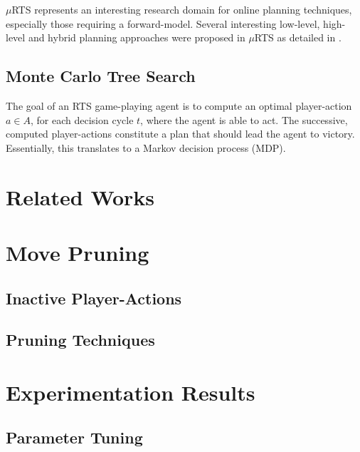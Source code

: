 \documentclass[conference]{IEEEtran}
\newcommand{\mRTS}{$\mu$RTS}
\begin{document}
\mRTS{} represents an interesting research domain for online planning techniques, especially those requiring a forward-model. Several interesting low-level, high-level and hybrid planning approaches were proposed in \mRTS{} as detailed in \cite{ouessai_online_2019}.

\subsection{Monte Carlo Tree Search}

The goal of an RTS game-playing agent is to compute an optimal player-action $a \in A$, for each decision cycle $t$, where the agent is able to act. The successive, computed player-actions constitute a plan that should lead the agent to victory. Essentially, this translates to a Markov decision process (MDP).


\section{Related Works}

\section{Move Pruning}

\subsection{Inactive Player-Actions}

\subsection{Pruning Techniques}

\section{Experimentation Results}

\subsection{Parameter Tuning}

\end{document}
